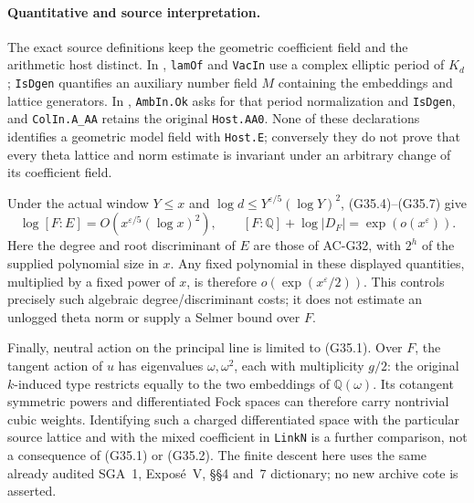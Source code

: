 \paragraph{Quantitative and source interpretation.}
The exact source definitions keep the geometric coefficient
field and the arithmetic host distinct.
In ,
\texttt{lamOf} and \texttt{VacIn} use a complex elliptic period
of $K_d$; \texttt{IsDgen} quantifies an auxiliary number field
$M$ containing the embeddings and lattice generators.
In ,
\texttt{AmbIn.Ok} asks for that period normalization and
\texttt{IsDgen}, and \texttt{ColIn.A\_AA} retains the original
\texttt{Host.AA0}.
None of these declarations identifies a geometric model field
with \texttt{Host.E}; conversely they do not prove that every
theta lattice and norm estimate is invariant under an arbitrary
change of its coefficient field.

Under the actual window $Y\le x$ and
$\log d\le Y^{\varepsilon/5}(\log Y)^2$, (G35.4)--(G35.7)
give
\[
 \log[F:E]=O(x^{\varepsilon/5}(\log x)^2),\qquad
 [F:\mathbb Q]+\log|D_F|=\exp(o(x^\varepsilon)).        \tag{G35.8}
\]
Here the degree and root discriminant of $E$ are those of
AC-G32, with $2^h$ of the supplied polynomial size in $x$.
Any fixed polynomial in these displayed quantities, multiplied
by a fixed power of $x$, is therefore
$o(\exp(x^\varepsilon/2))$.
This controls precisely such algebraic degree/discriminant costs;
it does not estimate an unlogged theta norm or supply a
Selmer bound over $F$.

Finally, neutral action on the principal line is limited to
(G35.1).  Over $F$, the tangent action of $u$ has eigenvalues
$\omega,\omega^2$, each with multiplicity $g/2$: the original
$k$-induced type restricts equally to the two embeddings of
$\mathbb Q(\omega)$.
Its cotangent symmetric powers and differentiated Fock spaces
can therefore carry nontrivial cubic weights.
Identifying such a charged differentiated space with the
particular source lattice and with the mixed coefficient in
\texttt{LinkN} is a further comparison, not a consequence
of (G35.1) or (G35.2).
The finite descent here uses the same already audited
SGA~1, Expos\'e~V, \S\S4 and~7 dictionary; no new archive
cote is asserted.
